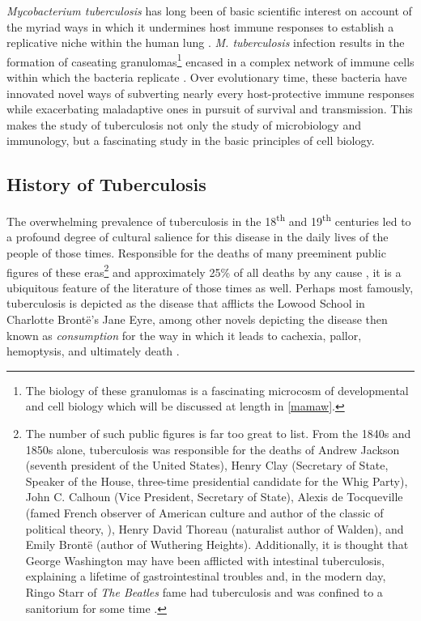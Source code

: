 \textit{Mycobacterium tuberculosis} has long been of basic scientific interest on account of the myriad ways in which it undermines host immune responses to establish a replicative niche within the human lung \citep{Baxt2013, Yu2019, Nguyen2009, Stanley2003, Monack2004, Hmama2015}. \textit{M. tuberculosis} infection results in the formation of caseating granulomas\footnote{The biology of these granulomas is a fascinating microcosm of developmental and cell biology which will be discussed at length in \autoref{mamaw}.} encased in a complex network of immune cells within which the bacteria replicate \citep{Pagan2018}. Over evolutionary time, these bacteria have innovated novel ways of subverting nearly every host\hyp{}protective immune responses while exacerbating maladaptive ones in pursuit of survival and transmission\citep{Ernst2012, Rahman2020, Chandra2022, Guan2021}. This makes the study of tuberculosis not only the study of microbiology and immunology, but a fascinating study in the basic principles of cell biology. 

\subsection{History of Tuberculosis}\label{tbhistory}

The overwhelming prevalence of tuberculosis in the 18\textsuperscript{th} and 19\textsuperscript{th} centuries led to a profound degree of cultural salience for this disease in the daily lives of the people of those times. Responsible for the deaths of many preeminent public figures of these eras\footnote{The number of such public figures is far too great to list. From the 1840s and 1850s alone, tuberculosis was responsible for the deaths of Andrew Jackson (seventh president of the United States), Henry Clay (Secretary of State, Speaker of the House, three\hyp{}time presidential candidate for the Whig Party), John C. Calhoun (Vice President, Secretary of State), Alexis de Tocqueville (famed French observer of American culture and author of the classic of political theory, ), Henry David Thoreau (naturalist author of Walden), and Emily Bront\"{e} (author of Wuthering Heights). Additionally, it is thought that George Washington may have been afflicted with intestinal tuberculosis, explaining a lifetime of gastrointestinal troubles \citep{Chernow2010} and, in the modern day, Ringo Starr of \textit{The Beatles} fame had tuberculosis and was confined to a sanitorium for some time \citep{Starr2016}.} and approximately 25\% of all deaths by any cause \citep{CDC2016}, it is a ubiquitous feature of the literature of those times as well. Perhaps most famously, tuberculosis is depicted as the disease that afflicts the Lowood School in Charlotte Bront\"{e}'s Jane Eyre, among other novels depicting the disease then known as \textit{consumption} for the way in which it leads to cachexia, pallor, hemoptysis, and ultimately death \citep{Bronte1847, Loddenkemper2015}.

